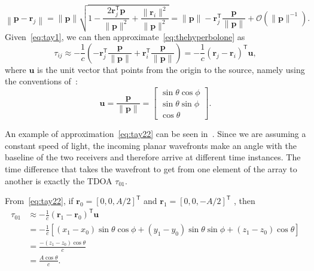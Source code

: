\begin{equation}
\left\|\mathbf{p}-\mathbf{r}_j\right\|
=\|\mathbf{p}\|\sqrt{1-\frac{2\mathbf{r}_j^\mathsf{T}\mathbf{p} }{\|\mathbf{p}\|^2}+\frac{\|\mathbf{r}_i\|^2}{\|\mathbf{p}\|^2}}
=\|\mathbf{p}\|-\mathbf{r}_j^\mathsf{T}\frac{\mathbf{p}}{\|\mathbf{p}\|}+\mathcal{O}\left(\|\mathbf{p}\|^{-1}\right).
\label{eq:tay1}
\end{equation}
Given~\eqref{eq:tay1}, we can then approximate~\eqref{eq:thehyperbolone} as
\begin{equation}
\tau_{ij}\approx-\frac{1}{c}
\left(
-\mathbf{r}_j^\mathsf{T}\frac{\mathbf{p}}{\|\mathbf{p}\|}
+\mathbf{r}_i^\mathsf{T}\frac{\mathbf{p}}{\|\mathbf{p}\|}
\right)
= -\frac{1}{c}\left(\mathbf{r}_j-\mathbf{r}_i\right)^\mathsf{T}\mathbf{u},
\label{eq:tay22}
\end{equation}
where \(\mathbf{u}\) is the unit vector that points from the origin to the source, namely using the conventions of~:
\begin{equation}
\mathbf{u}=
\frac{\mathbf{p}}{\|\mathbf{p}\|}=
\left[\begin{array}{c}
\sin \theta \cos \phi \\
\sin \theta \sin \phi \\
\cos \theta
\end{array}\right].
\label{eq:pointingvector}
\end{equation}

\noindent
An example of approximation~\eqref{eq:tay22} can be seen in~. Since we are assuming a
constant speed of light, the incoming planar wavefronts make an angle with the baseline of the two receivers and therefore arrive at different time instances. The time difference that takes the wavefront to get from one element of the array to another is exactly the TDOA \(\tau_{01}\).

\noindent
From~\eqref{eq:tay22}, if \(\mathbf{r}_0=[0,0,A/2]^\mathsf{T}\) and \(\mathbf{r}_1=[0,0,-A/2]^\mathsf{T}\) , then 
\begin{equation}
\begin{aligned}
\tau_{01}
& \approx
 -\frac{1}{c}\left(\mathbf{r}_1-\mathbf{r}_0\right)^\mathsf{T}\mathbf{u}\\
& =
-\frac{1}{c}\left[(x_{1}-x_{0})\sin \theta \cos \phi  +(y_{1}-y_{0})\sin \theta \sin \phi  +(z_{1}-z_{0})\cos \theta  \right]\\
& = \frac{-(z_{1}-z_{0})\cos\theta}{c}\\
& =\frac{A\cos\theta}{c}.
\label{eq:simplemodel}
\end{aligned}
\end{equation}

